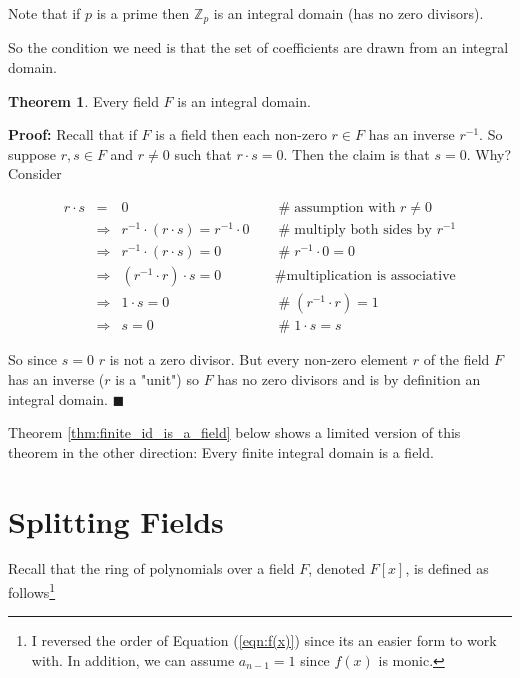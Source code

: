 \documentclass[11pt, oneside]{article}   	%
\theoremstyle{definition}
\newtheorem{thm}{Theorem}[section]
\begin{document}
\bigskip
\noindent
Note that if $p$ is a prime then $\mathbb{Z}_{p}$ is an integral
domain (has no zero divisors). 

\bigskip
\noindent
So the condition we need is that the set of coefficients are
drawn from an integral domain.  

\begin{thm}
Every field $F$ is an integral domain.
\label{thm:integral_domain}
\end{thm}

\noindent
\textbf{Proof:} Recall that if $F$ is a field then each non-zero
$r \in F$ has an inverse $r^{-1}$.  So suppose $r,s \in F$ and $r
\neq 0$ such that $r \cdot s = 0$. Then the claim is that $s =
0$.  Why? Consider


\begin{equation*}
\begin{array}{rcll} 
r \cdot s 
&=& 0                                                           &\quad \mathrel{\#} \text{assumption with $r \neq 0$} \\
&\Rightarrow& r^{-1} \cdot (r \cdot s) = r^{-1} \cdot 0         &\quad \mathrel{\#} \text{multiply both sides by $r^{-1}$} \\
&\Rightarrow& r^{-1} \cdot (r \cdot s) =  0                     &\quad \mathrel{\#} r^{-1} \cdot 0 = 0 \\
&\Rightarrow& (r^{-1} \cdot r) \cdot s =  0                     &\quad \mathrel{\#} \text{multiplication is associative} \\
&\Rightarrow& 1 \cdot s = 0                                     &\quad \mathrel{\#} (r^{-1} \cdot r) = 1 \\
&\Rightarrow& s = 0                                             &\quad \mathrel{\#}1 \cdot s = s
\end{array}
\end{equation*}

\bigskip
\noindent
So since $s = 0$ $r$ is not a zero divisor. But every non-zero
element $r$ of the field $F$ has an inverse ($r$ is a "unit") so
$F$ has no zero divisors and is by definition an integral
domain. $\blacksquare$

\bigskip
\noindent
Theorem \ref{thm:finite_id_is_a_field} below shows a limited
version of this theorem in the other direction: Every finite
integral domain is a field.

\section{Splitting Fields}
Recall that the ring of polynomials over a field $F$, denoted
$F[x]$, is defined as follows\footnote{I reversed the order of
Equation (\ref{eqn:f(x)}) since its an easier form to work with. 
In addition, we can assume $a_{n-1} = 1$ since $f(x)$ is monic.}
\end{document}
